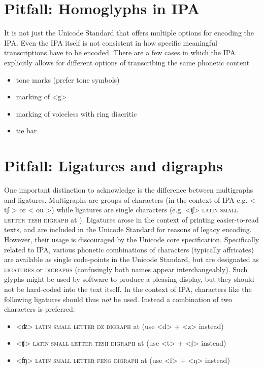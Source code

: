\section{Pitfall: Homoglyphs in IPA}

It is not just the Unicode Standard that offers multiple options for encoding 
the IPA. Even the IPA itself is not consistent in how specific meaningful 
transcriptions have to be encoded. There are a few cases in which the IPA 
explicitly allows for different options of transcribing the same phonetic 
content
\begin{itemize}
  \item tone marks (prefer tone symbols)
  \item marking of <g>
  \item marking of voiceless with ring diacritic
  \item tie bar
\end{itemize}

\section{Pitfall: Ligatures and digraphs}
\label{pitfall-ligatures-digraphs}     
       
One important distinction to acknowledge is the difference between multigraphs
and ligatures. Multigraphs are groups of characters (in the context of IPA e.g.
< tʃ > or < ou >) while ligatures are single characters (e.g. <ʧ> \textsc{latin
small letter tesh digraph} at ). Ligatures arose in the context of
printing easier-to-read texts, and are included in the Unicode Standard for
reasons of legacy encoding. However, their usage is discouraged by the Unicode
core specification. Specifically related to IPA, various phonetic combinations
of characters (typically affricates) are available as single code-points in the
Unicode Standard, but are designated as \textsc{ligatures} or \textsc{digraphs}
(confusingly both names appear interchangeably). Such glyphs might be used by
software to produce a pleasing display, but they should not be hard-coded into
the text itself. In the context of IPA, characters like the following ligatures
should thus \emph{not} be used. Instead a combination of two characters is
preferred:
      
\begin{itemize} 
	\item <ʣ> \textsc{latin small letter dz digraph} at  (use <d> + <z> instead) 
	\item <ʧ> \textsc{latin small letter tesh digraph} at  (use <t> + <ʃ> instead) 
	\item <ʩ> \textsc{latin small letter feng digraph} at  (use <f> + <ŋ> instead) 
\end{itemize}

